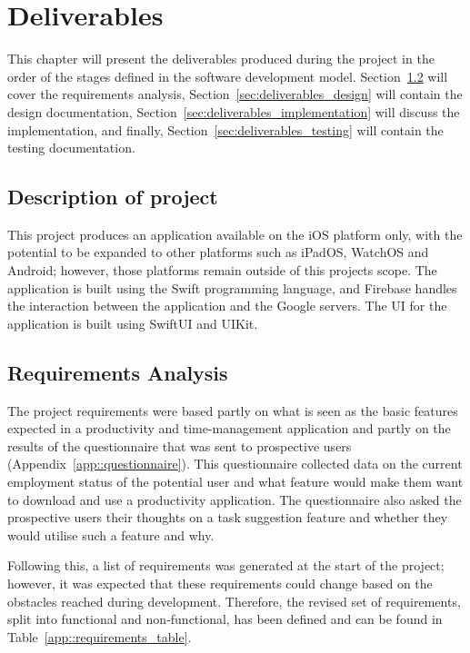 \chapter{Deliverables}
    \label{chap:deliverables}
    This chapter will present the deliverables produced during the project in the order of the stages defined in the software development model.  Section~\ref{sec:deliverables_requirements} will cover the requirements analysis, Section~\ref{sec:deliverables_design} will contain the design documentation, Section~\ref{sec:deliverables_implementation} will discuss the implementation, and finally, Section~\ref{sec:deliverables_testing} will contain the testing documentation.
    
    \section{Description of project}
        \label{sec:deliverables_description}
        This project produces an application available on the iOS platform only, with the potential to be expanded to other platforms such as iPadOS, WatchOS and Android; however, those platforms remain outside of this projects scope.  The application is built using the Swift programming language, and Firebase handles the interaction between the application and the Google servers.  The UI for the application is built using SwiftUI and UIKit.
        
    \section{Requirements Analysis}
        \label{sec:deliverables_requirements}
        The project requirements were based partly on what is seen as the basic features expected in a productivity and time-management application and partly on the results of the questionnaire that was sent to prospective users (Appendix~\ref{app::questionnaire}). This questionnaire collected data on the current employment status of the potential user and what feature would make them want to download and use a productivity application.  The questionnaire also asked the prospective users their thoughts on a task suggestion feature and whether they would utilise such a feature and why.
        
        Following this, a list of requirements was generated at the start of the project; however, it was expected that these requirements could change based on the obstacles reached during development.  Therefore, the revised set of requirements, split into functional and non-functional, has been defined and can be found in Table~\ref{app::requirements_table}.
        
